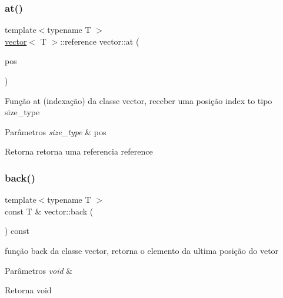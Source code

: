 \mbox{\label{classsc_1_1vector_ade22050951b0a2b13211efd3ba57e7f2}} 
\subsubsection{\texorpdfstring{at()}{at()}}
{\footnotesize\ttfamily template$<$typename T $>$ \\
\mbox{\hyperlink{classsc_1_1vector}{vector}}$<$ T $>$\+::reference vector\+::at (\begin{DoxyParamCaption}\item[{size\+\_\+type}]{pos }\end{DoxyParamCaption})}

Função at (indexação) da classe vector, receber uma posição index to tipo size\+\_\+type 
\begin{DoxyParams}{Parâmetros}
{\em size\+\_\+type} & pos \\
\hline
\end{DoxyParams}
\begin{DoxyReturn}{Retorna}
retorna uma referencia reference 
\end{DoxyReturn}
\mbox{\label{classsc_1_1vector_ad0b2d8bbc192a8cf340636fb66d26786}} 
\subsubsection{\texorpdfstring{back()}{back()}}
{\footnotesize\ttfamily template$<$typename T $>$ \\
const T \& vector\+::back (\begin{DoxyParamCaption}{ }\end{DoxyParamCaption}) const}

função back da classe vector, retorna o elemento da ultima posição do vetor 
\begin{DoxyParams}{Parâmetros}
{\em void} & \\
\hline
\end{DoxyParams}
\begin{DoxyReturn}{Retorna}
void 
\end{DoxyReturn}
\mbox{\label{classsc_1_1vector_ae198130cd01e8d5a4df07d6567b51eb4}} 
